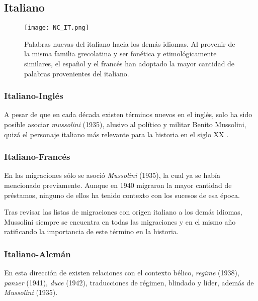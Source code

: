 \subsection{Italiano}%

\begin{figure}[h!]
	\centering
	\texttt{[image: NC\_IT.png]}
	\label{fig.NC_IT}
	\caption{Palabras nuevas del italiano hacia los demás idiomas. Al provenir de la misma familia grecolatina y ser fonética y etimológicamente similares, el español y el francés han adoptado la mayor cantidad de palabras provenientes del italiano.} 
\end{figure}




\subsubsection*{Italiano-Inglés}%

A pesar de que en cada década existen términos nuevos en el inglés, solo ha sido posible asociar \textit{mussolini} (1935),  alusivo al político y militar Benito Mussolini, quizá el personaje italiano más relevante para la historia en el siglo XX .

\subsubsection*{Italiano-Francés}%



En las migraciones sólo se asoció \textit{Mussolini} (1935), la cual ya se había mencionado previamente. Aunque en 1940 migraron la mayor cantidad de préstamos, ninguno de ellos ha tenido contexto con los sucesos de esa época. 

Tras revisar las listas de migraciones con origen italiano  a los demás idiomas, Mussolini siempre se encuentra en todas las migraciones y en el mismo año ratificando la importancia de este término en la historia. 



\subsubsection*{Italiano-Alemán}%

En esta dirección de existen relaciones con el contexto bélico,  \textit{regime} (1938), \textit{panzer} (1941), \textit{duce} (1942),  traducciones de régimen, blindado y líder, además de \textit{Mussolini} (1935). 



